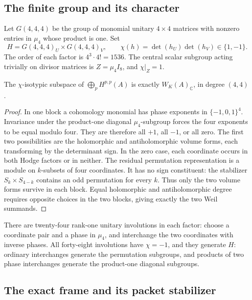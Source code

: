\subsection{The finite group and its character}

Let \(G(4,4,4)\) be the group of monomial unitary \(4\times4\)
matrices with nonzero entries in \(\mu_4\) whose product is one.
Set
\[
 H=G(4,4,4)_U\times G(4,4,4)_V,
 \qquad \chi(h)=\det(h_U)\det(h_V)\in\{1,-1\}.
\]
The order of each factor is \(4^3\cdot4!=1536\).
The central scalar subgroup acting trivially on divisor matrices is
\(Z=\mu_4 I_8\), and \(\chi|_Z=1\).

\begin{lemma}\label{lem:gaussian-trace-character}
The \(\chi\)-isotypic subspace of
\(\bigoplus_p H^{p,p}(A)\) is exactly \(W_K(A)_\mathbb C\), in
degree \((4,4)\).
\end{lemma}

\begin{proof}
In one block a cohomology monomial has phase exponents in
\(\{-1,0,1\}^4\).  Invariance under the product-one diagonal
\(\mu_4\)-subgroup forces the four exponents to be equal modulo
four.  They are therefore all \(+1\), all \(-1\), or all zero.
The first two possibilities are the holomorphic and antiholomorphic
volume forms, each transforming by the determinant sign.
In the zero case, each coordinate occurs in both Hodge factors or
in neither.  The residual permutation representation is a module on
\(k\)-subsets of four coordinates.  It has no sign constituent:
the stabilizer \(S_k\times S_{4-k}\) contains an odd permutation
for every \(k\).  Thus only the two volume forms survive in each
block.  Equal holomorphic and antiholomorphic degree requires
opposite choices in the two blocks, giving exactly the two Weil
summands.
\end{proof}

There are twenty-four rank-one unitary involutions in each factor:
choose a coordinate pair and a phase in \(\mu_4\), and interchange
the two coordinates with inverse phases.  All forty-eight
involutions have \(\chi=-1\), and they generate \(H\): ordinary
interchanges generate the permutation subgroups, and products of
two phase interchanges generate the product-one diagonal subgroups.

\subsection{The exact frame and its packet stabilizer}

